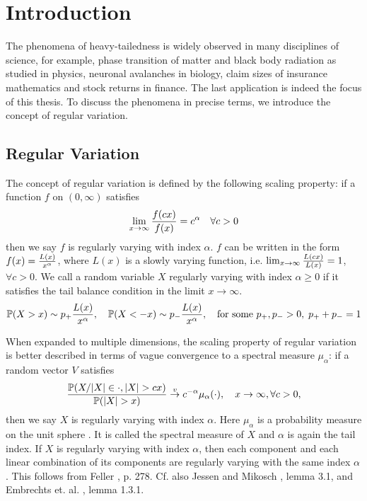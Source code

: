 \chapter{Introduction}\label{ch:intr}
The phenomena of heavy-tailedness is widely observed in many
disciplines of science, for example, phase transition of matter and
black body radiation as studied in physics, neuronal avalanches in
biology, claim sizes of insurance mathematics and stock returns in
finance. The last application is indeed the focus of this thesis. To
discuss the phenomena in precise terms, we introduce the concept of
regular variation.

\section{Regular Variation}
The concept of regular variation is defined by the following scaling
property: if a function $f$ on $(0, \infty)$ satisfies
\[
\lim_{x \to \infty} {f(c x) \over f(x)} = c^\alpha
\quad
\forall c > 0
\]
then we say $f$ is regularly varying with index $\alpha$.
$f$ can be written in the form $f(x) = {L(x) \over x^\alpha}$, where
$L(x)$ is a slowly varying function, i.e.
$\lim_{x \to \infty} {L(c x) \over L(x)} = 1$, $\forall c > 0$.
We call a random variable $X$ regularly varying with index
$\alpha \geq 0$ if it satisfies the tail balance condition in the
limit $x \to \infty$.
\[
\P(X > x) \sim p_+ {L(x) \over x^\alpha},\quad
\P(X < -x) \sim p_- {L(x) \over x^\alpha}, \quad
\text{for some } p_+, p_- > 0,\; p_+ + p_- = 1
\]

When expanded to multiple dimensions, the scaling property of regular
variation is better described in terms of vague convergence to a
spectral measure $\mu_\alpha$: if a random vector $V$ satisfies
\[
{
  \P(X/|X| \in \cdot, |X| > c x)
  \over
  \P(|X| > x)
}
\overset{v}{\to} c^{-\alpha} \mu_\alpha(\cdot),
\quad
x \to \infty, \forall c > 0,
\]
then we say $X$ is regularly varying with index $\alpha$. Here
$\mu_\alpha$ is a probability measure on the unit sphere
\cite{buraczewski:damek:mikosch:2016}. It is called the spectral 
measure of $X$ and $\alpha$ is again the tail index.
If $X$ is regularly varying with index $\alpha$, then each component
and each linear combination of its components are regularly
varying with the same index $\alpha$. This follows from Feller
\cite{feller}, p. 278. Cf. also Jessen and Mikosch
\cite{JessenMikosch2006}, lemma 3.1, and Embrechts et. al.
\cite{embrechts:klueppelberg:mikosch:1997}, lemma 1.3.1.

